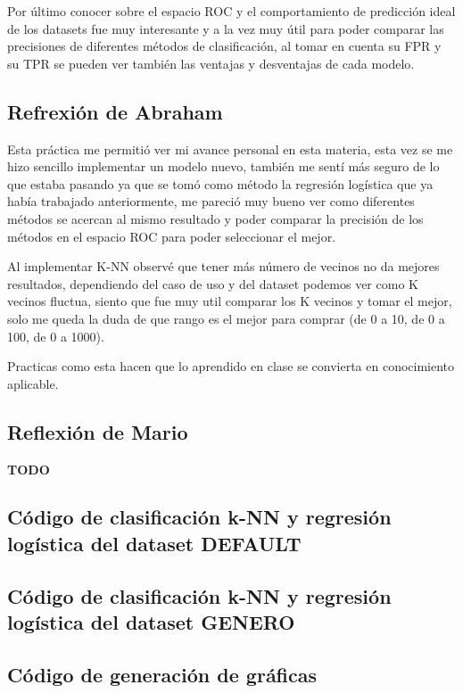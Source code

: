 \documentclass[sigconf,authorversion,nonacm]{acmart}
\begin{document}
Por último conocer sobre el espacio ROC y el comportamiento de predicción ideal de los datasets fue muy interesante y a la vez muy útil para poder comparar las precisiones de diferentes métodos de clasificación, al tomar en cuenta su FPR y su TPR se pueden ver también las ventajas y desventajas de cada modelo.

\subsection{Refrexión de Abraham}
Esta práctica me permitió ver mi avance personal en esta materia, esta vez se me hizo sencillo implementar un modelo nuevo, también me sentí más seguro de lo que estaba pasando ya que se tomó como método la regresión logística que ya había trabajado anteriormente, me pareció muy bueno ver como diferentes métodos se acercan al mismo resultado y poder comparar la precisión de los métodos en el espacio ROC para poder seleccionar el mejor.

Al implementar K-NN observé que tener más número de vecinos no da mejores resultados, dependiendo del caso de uso y del dataset podemos ver como K vecinos fluctua, siento que fue muy util comparar los K vecinos y tomar el mejor, solo me queda la duda de que rango es el mejor para comprar (de 0 a 10, de 0 a 100, de 0 a 1000).

Practicas como esta hacen que lo aprendido en clase se convierta en conocimiento aplicable.
\subsection{Reflexión de Mario}
\textbf{TODO}





\clearpage

\appendix

\lstset{style=customstyle}

\begin{figure*}
 \section{Código de clasificación k-NN y regresión logística del dataset DEFAULT}
  \label{appendix:nn_default}
  
\end{figure*}

\begin{figure*}
  \section{Código de clasificación k-NN  y regresión logística del dataset GENERO}
  \label{appendix:nn_genero}
  
\end{figure*}

\begin{figure*}
  \section{Código de generación de gráficas}
  \label{appendix:graphs}
  
\end{figure*}
\end{document}
